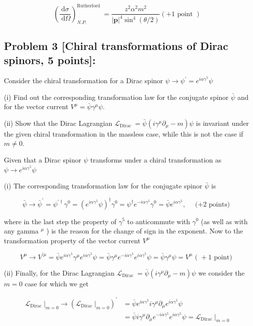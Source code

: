 \documentclass[10pt, letterpaper]{article}
\begin{document}
$$
\left(\frac{\mathrm{d} \sigma}{\mathrm{~d} \Omega}\right)_{N . P .}^{\text {Rutherford }}=\frac{z^2 \alpha^2 m^2}{|\mathbf{p}|^4 \sin ^4(\theta / 2)}(+1 \text { point })
$$

\subsection{Problem 3 [Chiral transformations of Dirac spinors, 5 points]:}

Consider the chiral transformation for a Dirac spinor $\psi \rightarrow \psi^{\prime}=e^{i \alpha \gamma^5} \psi$

(i) Find out the corresponding transformation law for the conjugate spinor $\bar{\psi}$ and for the vector current $V^\mu=\bar{\psi} \gamma^\mu \psi$.

(ii) Show that the Dirac Lagrangian $\mathcal{L}_{\text {Dirac }}=\bar{\psi}\left(i \gamma^\mu \partial_\mu-m\right) \psi$ is invariant under the given chiral transformation in the massless case, while this is not the case if $m \neq 0$.


Given that a Dirac spinor $\psi$ transforms under a chiral transformation as $\psi \rightarrow e^{i \alpha \gamma^5} \psi$

(i) The corresponding transformation law for the conjugate spinor $\bar{\psi}$ is

$$
\bar{\psi} \longrightarrow \bar{\psi}^{\prime}=\psi^{\prime \dagger} \gamma^0=\left(e^{i \alpha \gamma^5} \psi\right)^{\dagger} \gamma^0=\psi^{\dagger} e^{-i \alpha \gamma^5} \gamma^0=\bar{\psi} e^{i \alpha \gamma^5}, \quad \text { (+2 points) }
$$

where in the last step the property of $\gamma^5$ to anticommute with $\gamma^0$ (as well as with any gamma ${ }^\mu$ ) is the reason for the change of sign in the exponent.
Now to the transformation property of the vector current $V^\mu$

$$
V^\mu \longrightarrow V^{\prime \mu}=\bar{\psi} e^{i \alpha \gamma^5} \gamma^\mu e^{i \alpha \gamma^5} \psi=\bar{\psi} \gamma^\mu e^{-i \alpha \gamma^5} e^{i \alpha \gamma^5} \psi=\bar{\psi} \gamma^\mu \psi=V^\mu \text { ( }+1 \text { point) }
$$

(ii) Finally, for the Dirac Lagrangian $\mathcal{L}_{\text {Dirac }}=\bar{\psi}\left(i \gamma^\mu \partial_\mu-m\right) \psi$ we consider the $m=0$ case for which we get

$$
\begin{aligned}
\left.\mathcal{L}_{\text {Dirac }}\right|_{m=0} \longrightarrow\left(\left.\mathcal{L}_{\text {Dirac }}\right|_{m=0}\right)^{\prime} & =\bar{\psi} e^{i \alpha \gamma^5} i \gamma^\mu \partial_\mu e^{i \alpha \gamma^5} \psi \\
& =\bar{\psi} i \gamma^\mu \partial_\mu e^{-i \alpha \gamma^5} e^{i \alpha \gamma^5} \psi=\left.\mathcal{L}_{\text {Dirac }}\right|_{m=0}
\end{aligned}
$$
\end{document}
